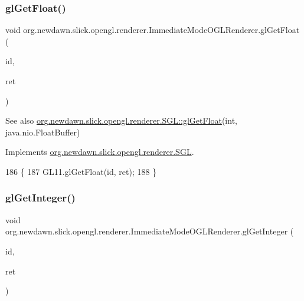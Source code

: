 \subsubsection{\texorpdfstring{gl\+Get\+Float()}{glGetFloat()}}
{\footnotesize\ttfamily void org.\+newdawn.\+slick.\+opengl.\+renderer.\+Immediate\+Mode\+O\+G\+L\+Renderer.\+gl\+Get\+Float (\begin{DoxyParamCaption}\item[{int}]{id,  }\item[{Float\+Buffer}]{ret }\end{DoxyParamCaption})\hspace{0.3cm}{\ttfamily [inline]}}

\begin{DoxySeeAlso}{See also}
\mbox{\hyperlink{interfaceorg_1_1newdawn_1_1slick_1_1opengl_1_1renderer_1_1_s_g_l_aa9013a2eb8ec3fa76714ed1cfcb6f5bf}{org.\+newdawn.\+slick.\+opengl.\+renderer.\+S\+G\+L\+::gl\+Get\+Float}}(int, java.\+nio.\+Float\+Buffer) 
\end{DoxySeeAlso}


Implements \mbox{\hyperlink{interfaceorg_1_1newdawn_1_1slick_1_1opengl_1_1renderer_1_1_s_g_l_aa9013a2eb8ec3fa76714ed1cfcb6f5bf}{org.\+newdawn.\+slick.\+opengl.\+renderer.\+S\+GL}}.


\begin{DoxyCode}
186                                                     \{
187         GL11.glGetFloat(\textcolor{keywordtype}{id}, ret);
188     \}
\end{DoxyCode}
\mbox{\label{classorg_1_1newdawn_1_1slick_1_1opengl_1_1renderer_1_1_immediate_mode_o_g_l_renderer_a17ed77ba3c4fcd0246fad1357bae4f22}} 
\subsubsection{\texorpdfstring{gl\+Get\+Integer()}{glGetInteger()}}
{\footnotesize\ttfamily void org.\+newdawn.\+slick.\+opengl.\+renderer.\+Immediate\+Mode\+O\+G\+L\+Renderer.\+gl\+Get\+Integer (\begin{DoxyParamCaption}\item[{int}]{id,  }\item[{Int\+Buffer}]{ret }\end{DoxyParamCaption})\hspace{0.3cm}{\ttfamily [inline]}}

